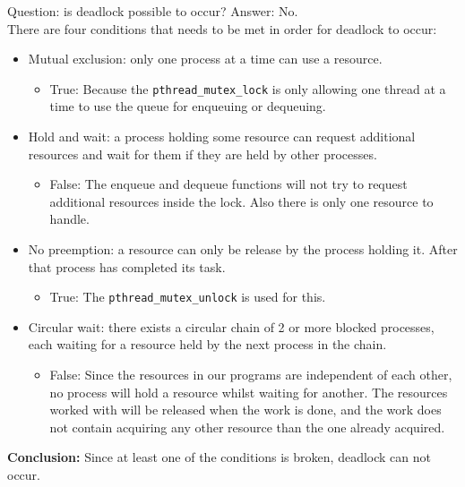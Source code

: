 \documentclass[a4paper,11pt,twoside,fleqn]{article}
\begin{document}
Question: is deadlock possible to occur? Answer: No.
\\
There are four conditions that needs to be met in order for deadlock to occur:
\begin{itemize}

\item
Mutual exclusion: only one process at a time can use a resource.
\begin{itemize} \item True: Because the \verb+pthread_mutex_lock+ is only allowing one thread at a time to use the queue for enqueuing or dequeuing.
\end{itemize}

\item Hold and wait: a process holding some resource can request additional resources and wait for them if they are held by other processes.
\begin{itemize}
\item False: The enqueue and dequeue functions will not try to request additional resources inside the lock. Also there is only one resource to handle.
\end{itemize}

\item No preemption: a resource can only be release by the process holding it. After that process has completed its task.
\begin{itemize}
\item True: The \verb+pthread_mutex_unlock+ is used for this.
\end{itemize} 

\item Circular wait: there exists a circular chain of 2 or more blocked processes, each waiting for a resource held by the next process in the chain.
\begin{itemize}
\item False: Since the resources in our programs are independent of each other, no process will hold a resource whilst waiting for another. The resources worked with will be released when the work is done, and the work does not contain acquiring any other resource than the one already acquired.
\end{itemize}

\end{itemize}

\textbf{Conclusion:} Since at least one of the conditions is broken, deadlock can not occur.

\clearpage
\end{document}
